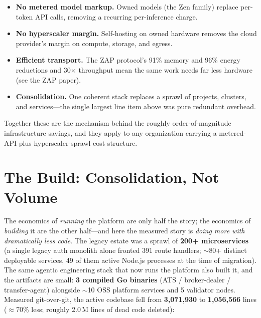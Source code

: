 \documentclass[11pt,letterpaper]{article}
\begin{document}
\begin{itemize}
  \item \textbf{No metered model markup.} Owned models (the Zen family) replace
  per-token API calls, removing a recurring per-inference charge.
  \item \textbf{No hyperscaler margin.} Self-hosting on owned hardware removes the
  cloud provider's margin on compute, storage, and egress.
  \item \textbf{Efficient transport.} The ZAP protocol's 91\% memory and 96\%
  energy reductions and 30$\times$ throughput mean the same work needs far less
  hardware (see the ZAP paper).
  \item \textbf{Consolidation.} One coherent stack replaces a sprawl of projects,
  clusters, and services---the single largest line item above was pure redundant
  overhead.
\end{itemize}

Together these are the mechanism behind the roughly order-of-magnitude
infrastructure savings, and they apply to any organization carrying a metered-API
plus hyperscaler-sprawl cost structure.

\section{The Build: Consolidation, Not Volume}

The economics of \emph{running} the platform are only half the story; the economics
of \emph{building} it are the other half---and here the measured story is
\emph{doing more with dramatically less code}. The legacy estate was a sprawl of
\textbf{200+ microservices} (a single legacy auth monolith alone fronted 391 route
handlers; $\sim$80+ distinct deployable services, 49 of them active Node.js
processes at the time of migration). The same agentic engineering stack that now
runs the platform also built it, and the artifacts are small: \textbf{3 compiled Go
binaries} (ATS / broker-dealer / transfer-agent) alongside $\sim$10 OSS platform
services and 5 validator nodes. Measured git-over-git, the active codebase fell from
\textbf{3{,}071{,}930} to \textbf{1{,}056{,}566} lines ($\approx$70\% less; roughly
2.0\,M lines of dead code deleted):
\end{document}

